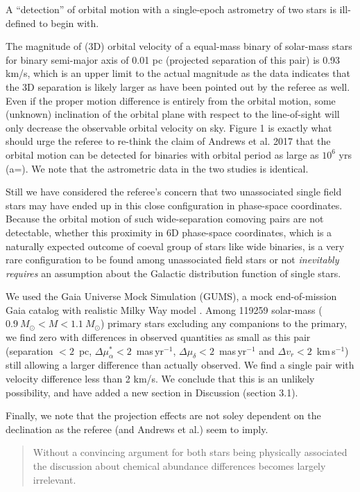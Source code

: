 \documentclass[12pt]{article}
\begin{document}
A ``detection'' of orbital motion with a single-epoch astrometry of two
stars is ill-defined to begin with.

The magnitude of (3D) orbital velocity of a equal-mass binary of solar-mass
stars for binary semi-major axis of 0.01 pc (projected separation of this pair)
is 0.93 km/s,
which is an upper limit to the actual magnitude as the data
indicates that the 3D separation is likely larger as have been pointed
out by the referee as well.
Even if the proper motion difference is entirely from the orbital motion, some
(unknown) inclination of the orbital plane with respect to the line-of-sight
will only decrease the observable orbital velocity on sky.
Figure 1 is exactly what should urge the referee to re-think the claim of
Andrews et al. 2017 that the orbital motion can be detected for binaries with
orbital period as large as $10^6$ yrs (a=).
We note that the astrometric data in the two studies is identical.

Still we have considered the referee's concern that two unassociated
single field stars may have ended up in this close configuration in
phase-space coordinates. Because the orbital motion of such
wide-separation comoving pairs are not detectable, whether this
proximity in 6D phase-space coordinates, which is a naturally expected
outcome of coeval group of stars like wide binaries, is a very rare
configuration to be found among unassociated field stars or not
\emph{inevitably requires} an assumption about the Galactic distribution
function of single stars.

We used the Gaia Universe Mock Simulation (GUMS), a mock
end-of-mission Gaia catalog with realistic Milky Way model \citep{gums}.
Among 119259 solar-mass ($0.9~M_\odot< M < 1.1~M_\odot$) primary stars excluding
any companions to the primary, we find zero with differences in observed
quantities as small as this pair
(separation $<2$~pc,
$\Delta \mu_\alpha^* < 2$~mas\,yr$^{-1}$,
$\Delta \mu_\delta<2$~mas\,yr$^{-1}$ and
$\Delta v_r < 2$~km\,s$^{-1}$) still
allowing a larger difference than actually observed.
We find a single pair with velocity difference less than 2 km/s.
We conclude that this is an unlikely possibility, and 
have added a new section in Discussion (section 3.1).

Finally, we note that the projection effects are not soley dependent on the
declination as the referee (and Andrews et al.) seem to imply.

\begin{quote}
Without a convincing argument for both stars being physically associated
the discussion about chemical abundance differences becomes largely
irrelevant.
\end{quote}
\end{document}

